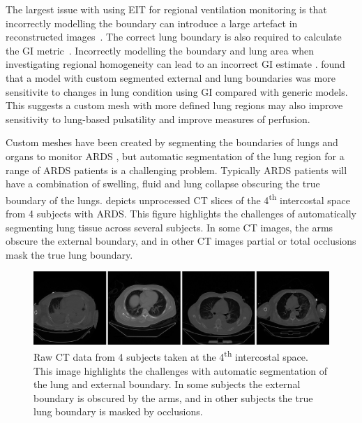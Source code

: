 The largest issue with using EIT for regional 
ventilation monitoring is that incorrectly modelling the 
boundary can introduce a large artefact in reconstructed
images~\parencite{grychtol_impact_2012}. The correct 
lung boundary is also required to calculate the GI
metric~\parencite{zhao_evaluation_2009}.
Incorrectly modelling the boundary and lung area when investigating 
regional homogeneity can lead to an incorrect GI 
estimate \parencite{yang_lung_2021}. 
 found that 
a model with custom segmented external and lung boundaries 
was more sensitivite to changes in lung condition using GI 
compared with generic models.
This suggests a custom mesh with more defined lung regions 
may also improve sensitivity to lung-based pulsatility and 
improve measures of perfusion.

Custom meshes have been created by segmenting the boundaries of lungs and organs
to monitor ARDS \parencite{yang_lung_2021}, but automatic segmentation of the lung region 
for a range of ARDS patients is a challenging problem. Typically ARDS patients 
will have a combination of swelling, fluid and lung collapse obscuring the 
true boundary of the lungs.  depicts unprocessed CT slices 
of the 4\textsuperscript{th} intercostal space from 4 subjects with
ARDS. This figure highlights the challenges  of automatically 
segmenting lung tissue across several subjects. 
In some CT images, the arms obscure the external boundary, and in other 
CT images partial or total occlusions 
mask the true lung boundary.

\begin{figure}
	\centering
	\includegraphics[width=\textwidth]{chapter5-CT_to_mesh/imgs/raw_ct_imgs.png}
	\caption[Raw CT images at the 4\textsuperscript{th} intersoctal space]{\label{fig:raw-ct}%
	Raw CT data from 4 subjects  taken at the 4\textsuperscript{th} intercostal space.
	This image highlights the challenges with automatic segmentation of the lung and external boundary. 
	In some subjects the external boundary is obscured by the arms, and in other subjects the 
	true lung boundary is masked by occlusions.
	}
\end{figure}

